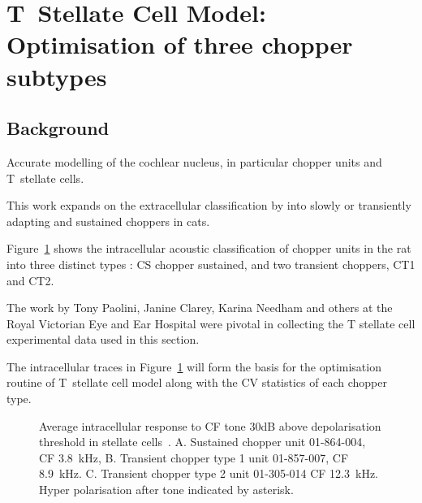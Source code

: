  

\section[TS Cell Model]{T~Stellate Cell Model: Optimisation of three chopper subtypes}

\subsection{Background}
 
Accurate modelling of the cochlear nucleus, in particular chopper units and T~stellate cells.

This work expands on the extracellular classification by \citep{BlackburnSachs:1989} into slowly or transiently adapting and sustained choppers in cats.


Figure~\ref{fig:PaoliniAIV} shows the intracellular acoustic classification of chopper units in the rat into three distinct types \citep{PaoliniClareyEtAl:2005}: CS chopper sustained, and two transient choppers, CT1 and CT2.

The work by Tony Paolini, Janine Clarey, Karina Needham and others at the Royal Victorian Eye and Ear Hospital were pivotal in collecting the T stellate cell experimental data used in this section.

The intracellular traces in Figure~\ref{fig:PaoliniAIV} will form the basis for the optimisation routine of T~stellate cell model along with the CV statistics of each chopper type.  

\begin{figure}[htb]
\centering%
\hfill%
\hfill%
\caption[Average intracellular response data in stellate cells in rats.]{Average intracellular response to CF tone 30dB above depolarisation threshold in stellate  cells~\citep[Reproduced from Fig.~2, ][]{PaoliniClareyEtAl:2005}.
A. Sustained chopper unit 01-864-004, CF 3.8~kHz,
B. Transient chopper type 1 unit 01-857-007, CF 8.9~kHz.
C. Transient chopper type 2 unit 01-305-014 CF 12.3~kHz.
Hyper polarisation after tone indicated by asterisk.  \label{fig:PaoliniAIV}}
\end{figure}

